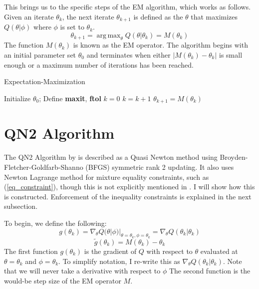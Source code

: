 \documentclass[letter,12pt]{article}
\DeclareMathOperator*{\argmax}{arg\,max}
\begin{document}
This brings us to the specific steps of the EM algorithm, which works as follows.  Given an iterate $\theta_k$, the next iterate $\theta_{k+1}$ is defined as the $\theta$ that maximizes $Q(\theta|\phi)$ where $\phi$ is set to $\theta_k$.
\[
\theta_{k+1} = \argmax_{\theta}  Q(\theta|\theta_k) = M(\theta_k)
\]
The function $M(\theta_k)$ is known as the EM operator.  The algorithm begins with an initial parameter set $\theta_0$ and terminates when either $|M(\theta_k)-\theta_k|$ is small enough or a maximum number of iterations has been reached.


\begin{algorithm}
\caption{Expectation-Maximization}
\label{alg:em}
\begin{algorithmic}[1]
\State Initialize $\theta_0$; Define \textbf{maxit}, \textbf{ftol}
\State $k = 0$
\State $k = k+1$
\State $\theta_{k+1} = M(\theta_k)$
\EndWhile
\end{algorithmic}
\end{algorithm}

\section{QN2 Algorithm}

The QN2 Algorithm by \cite{jamshidianj97} is described as a Quasi Newton method using Broyden-Fletcher-Goldfarb-Shanno (BFGS) symmetric rank 2 updating.  It also uses Newton Lagrange method for mixture equality constraints, such as (\ref{eq_constraint}), though this is not explicitly mentioned in \cite{jamshidianj97}.  I will show how this is constructed.  Enforcement of the inequality constraints is explained in the next subsection. 

To begin, we define the following:
\begin{equation} \label{eq:define_g}
g(\theta_k) = \nabla_{\theta}Q(\theta|\phi)|_{\theta =\theta_k, \phi = \theta_k}
= \nabla_{\theta}Q(\theta_k|\theta_k)
\end{equation}
\begin{equation} \label{eq:define_gsquiggly}
\tilde{g}(\theta_k) = M(\theta_k) - \theta_k
\end{equation}
The first function $g(\theta_k)$ is the gradient of $Q$ with respect to $\theta$ evaluated at $\theta = \theta_k$ and $\phi=\theta_k$.  To simplify notation, I re-write this as $\nabla_{\theta}Q(\theta_k|\theta_k)$.  Note that we will never take a derivative with respect to $\phi$ The second function is the would-be step size of the EM operator $M$.   
\end{document}
